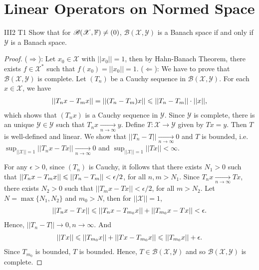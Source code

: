 \chapter{Linear Operators on Normed Space}\label{chp:3_2}

\begin{exercise}{III2 T1}{}
    Show that for $\mathscr{B}(\mathscr{\mathscr{X}},\mathbb{F})\neq (0)$,
    $\mathscr{B}(\mathscr{\mathscr{X}},\mathscr{\mathscr{Y}})$ is a Banach space 
    if and only if $\mathscr{\mathscr{Y}}$ is a Banach space.
\end{exercise}
\begin{proof}
    ($\Rightarrow$):
        Let $x_0\in \mathscr{X}$ with $||x_0||=1$,
        then by Hahn-Banach Theorem, there exists $f\in\mathscr{X}^*$ such that $f(x_0)=||x_0||=1$.
    ($\Leftarrow$):
    We have to prove that $\mathscr{B}(\mathscr{X},\mathscr{Y})$ is complete.
    Let $(T_n)$ be a Cauchy sequence in $\mathscr{B}(\mathscr{\mathscr{X}},\mathscr{\mathscr{Y}})$.
    For each $x\in\mathscr{\mathscr{X}}$, we have
    \begin{align*}
        ||T_nx-T_mx||=||(T_n-T_m)x||\leqslant ||T_n-T_m||\cdot ||x||,
    \end{align*}
    which shows that $(T_nx)$ is a Cauchy sequence in $\mathscr{Y}$.
    Since $\mathscr{Y}$ is complete, there is an unique $\mathscr{Y}\in \mathscr{Y}$ such that $T_nx\underset{n\rightarrow \infty}{\longrightarrow}y$.
    Define $T:\mathscr{X}\rightarrow \mathscr{Y}$ given by $Tx=y$. Then $T$ is well-defined and linear.
    We show that $||T_n-T||\underset{n\rightarrow \infty}{\longrightarrow} 0$ and $T$ is bounded,
    i.e. $\sup_{||\mathscr{X}||=1}||T_nx-Tx||\underset{n\rightarrow \infty}{\longrightarrow} 0$
    and $\sup_{||\mathscr{X}||=1}||Tx||<\infty$.
    
    For any $\epsilon>0$, since $(T_n)$ is Cauchy, 
    it follows that there exists $N_1>0$ such that 
    $||T_nx-T_mx||\leqslant ||T_n-T_m||<\epsilon/2$, for all $n,m>N_1$.
    Since $T_nx\underset{n\rightarrow \infty}{\longrightarrow} Tx$, 
    there exists $N_2>0$ such that $||T_mx-Tx||<\epsilon/2$, for all $m>N_2$.
    Let $N=\max\{N_1,N_2\}$ and $m_0>N$, then for $||\mathscr{X}||=1$,
    \begin{align*}
        ||T_nx-Tx||\leqslant ||T_nx-T_{m_0}x||+||T_{m_0}x-Tx||<\epsilon.
    \end{align*}
    Hence, $||T_n-T||\rightarrow 0, n\rightarrow \infty$. And
    \begin{align*}
        ||Tx||\leqslant ||T_{m_0}x||+||Tx-T_{m_0}x||\leqslant ||T_{m_0}x||+\epsilon.
    \end{align*}
    Since $T_{m_0}$ is bounded, $T$ is bounded. Hence, $T\in \mathscr{B}(\mathscr{\mathscr{X}},\mathscr{\mathscr{Y}})$ and so $\mathscr{B}(\mathscr{\mathscr{X}},\mathscr{\mathscr{Y}})$ is complete.
\end{proof}


